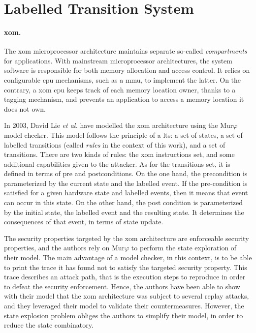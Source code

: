 \section{Labelled Transition System} %
\label{sec:related:lts}

\paragraph{\ac{xom}.}
%
The \ac{xom} microprocessor architecture maintains separate so-called
\emph{compartments} for applications.
%
With mainstream microprocessor architectures, the system software is responsible
for both memory allocation and access control.
%
It relies on configurable \ac{cpu} mechanisms, such as a \ac{mmu}, to implement
the latter.
%
On the contrary, a \ac{xom} \ac{cpu} keeps track of each memory location owner,
thanks to a tagging mechanism, and prevents an application to access a memory
location it does not own.

In 2003, David Lie \emph{et al.} have modelled the \ac{xom} architecture using
the Mur$\varphi$ model checker.
%
This model follows the principle of a \ac{lts}: a set of states, a set of
labelled transitions (called \emph{rules} in the context of this work), and a
set of transitions.
%
There are two kinds of rules: the \ac{xom} instructions set, and some additional
capabilities given to the attacker.
%
As for the transitions set, it is defined in terms of pre and postconditions.
%
On the one hand, the precondition is parameterized by the current state and the
labelled event.
%
If the pre-condition is satisfied for a given hardware state and labelled events,
then it means that event can occur in this state.
%
On the other hand, the post condition is parameterized by the initial state, the
labelled event and the resulting state.
%
It determines the consequences of that event, in terms of state update.

The security properties targeted by the \ac{xom} architecture are enforceable
security properties, and the authors rely on Mur$\varphi$ to perform the state
exploration of their model.
%
The main advantage of a model checker, in this context, is to be able to print
the trace it has found not to satisfy the targeted security property.
%
This trace describes an attack path, that is the execution steps to reproduce in
order to defeat the security enforcement.
%
Hence, the authors have been able to show with their model that the \ac{xom}
architecture was subject to several replay attacks, and they leveraged their
model to validate their countermeasures.
%
However, the state explosion problem obliges the authors to simplify their
model, in order to reduce the state combinatory.

